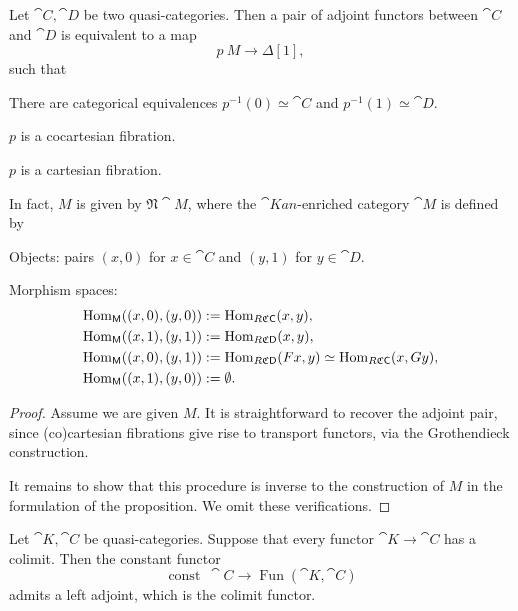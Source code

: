 \begin{proposition}
    Let $\cat C,\cat D$ be two quasi-categories.
    Then a pair of adjoint functors between $\cat C$ and $\cat D$
    is equivalent to a map 
    \[ p\:M\to\Delta[1], \]
    such that 
    \begin{itms}
        \item There are categorical equivalences
        $p^{-1}(0)\simeq\cat C$ and $p^{-1}(1)\simeq\cat D$.
        \item $p$ is a cocartesian fibration.
        \item $p$ is a cartesian fibration.
    \end{itms}
    In fact, $M$ is given by $\mathfrak N\cat M$,
    where the $\cat{Kan}$-enriched category $\cat M$ is defined by 
    \begin{itms}
        \item Objects: pairs $(x,0)$ for $x\in\cat C$ and $(y,1)$ for $y\in\cat D$.
        \item Morphism spaces:
        \[ \begin{aligned}
            \operatorname{Hom}_{\mathsf{M}}((x,0),(y,0)) &:= \operatorname{Hom}_{R\mathfrak C\mathsf{C}}(x,y), \\
            \operatorname{Hom}_{\mathsf{M}}((x,1),(y,1)) &:= \operatorname{Hom}_{R\mathfrak C\mathsf{D}}(x,y), \\
            \operatorname{Hom}_{\mathsf{M}}((x,0),(y,1)) &:= \operatorname{Hom}_{R\mathfrak C\mathsf{D}}(Fx,y)\simeq\operatorname{Hom}_{R\mathfrak C\mathsf{C}}(x,Gy), \\
            \operatorname{Hom}_{\mathsf{M}}((x,1),(y,0)) &:= \emptyset.
        \end{aligned} \]
    \end{itms}
\end{proposition}

\begin{proof}
    Assume we are given $M$.
    It is straightforward to recover the adjoint pair, since (co)cartesian fibrations 
    give rise to transport functors, via the Grothendieck construction.

    It remains to show that this procedure is inverse to 
    the construction of $M$ in the formulation of the proposition.
    We omit these verifications.
\end{proof}

\begin{proposition}
    Let $\cat K,\cat C$ be quasi-categories.
    Suppose that every functor $\cat K\to\cat C$ has a colimit.
    Then the constant functor 
    \[ \operatorname{const}\:\cat C\to\operatorname{Fun}(\cat K,\cat C) \]
    admits a left adjoint, which is the colimit functor.
\end{proposition}

